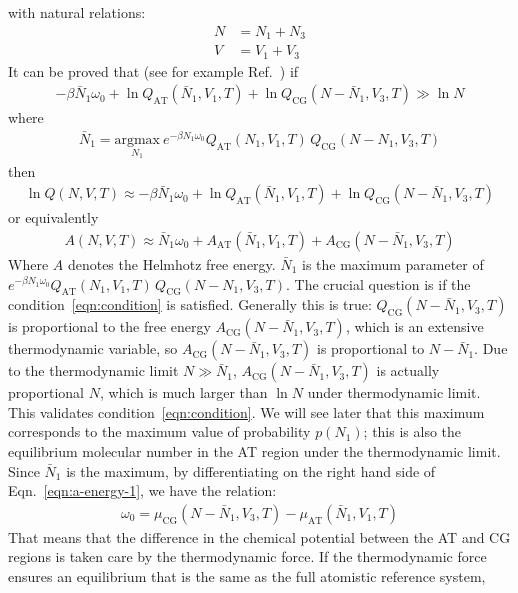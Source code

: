 \documentclass[aip,jcp,a4paper,reprint,onecolumn]{revtex4-1}
\newcommand{\AT}{{\textrm{{AT}}}}
\newcommand{\CG}{{\textrm{CG}}}
\begin{document}
with natural relations:
\begin{align}
  N &= N_1 + N_3\\
  V &= V_1 + V_3
\end{align}
It can be proved that (see for example
Ref.~\cite{tuckeman2010statistical}) if
\begin{align}\label{eqn:condition}
  -\beta \bar N_1\omega_0 +
  \ln Q_{\AT}(\bar N_1, V_1, T) + \ln Q_{\CG}(N - \bar N_1, V_3, T) \gg \ln N 
\end{align}
where
\begin{align}
  \bar N_1 = \underset{N_1}{\textrm{argmax}}\:
  e^{-\beta N_1\omega_0}
  Q_{\AT}(N_1, V_1, T) \,Q_{\CG}(N - N_1, V_3, T)
\end{align}
then
\begin{align}
  \ln Q(N, V, T)
  \approx
  -\beta \bar N_1\omega_0 + 
  \ln Q_{\AT}(\bar N_1, V_1, T) + \ln Q_{\CG}(N - \bar N_1, V_3, T)
\end{align}
or equivalently
\begin{align}\label{eqn:a-energy-1}
  A(N, V, T)
  \approx
  \bar N_1\omega_0 +
  A_{\AT}(\bar N_1, V_1, T) + A_{\CG}(N - \bar N_1, V_3, T)
\end{align}
Where $A$ denotes the Helmhotz free energy.  $\bar N_1$ is the maximum
parameter of $e^{-\beta N_1\omega_0} Q_{\AT}(N_1, V_1, T) \,Q_{\CG}(N - N_1,
V_3, T)$.
The crucial question is if the condition~\eqref{eqn:condition}
is satisfied. Generally this is true: $Q_{\CG}(N - \bar N_1, V_3, T)$
is proportional to the free energy $A_{\CG}(N - \bar N_1, V_3, T)$,
which is an extensive thermodynamic variable, so
$A_{\CG}(N - \bar N_1, V_3, T)$ is proportional to $N-\bar N_1$.
Due to the thermodynamic limit $N \gg \bar N_1$,
$A_{\CG}(N - \bar N_1, V_3, T)$ is actually proportional $N$, which
is much larger than $\ln N$ under thermodynamic limit. This
validates condition~\eqref{eqn:condition}.
We will see later that this maximum corresponds to the maximum
value of probability $p(N_1)$; this is also the equilibrium molecular
number in the AT region under the thermodynamic limit.  Since $\bar
N_1$ is the maximum, by differentiating on the right hand side of
Eqn.~\eqref{eqn:a-energy-1}, we have the relation:
\begin{align}
  \omega_0 = \mu_{\CG}(N - \bar N_1, V_3, T)  - \mu_{\AT}(\bar N_1, V_1, T)
\end{align}
That means that the difference in the chemical potential between the AT and CG
regions is taken care by the thermodynamic force.
If the thermodynamic force ensures an
equilibrium that is the same as the full atomistic reference system,
\end{document}
